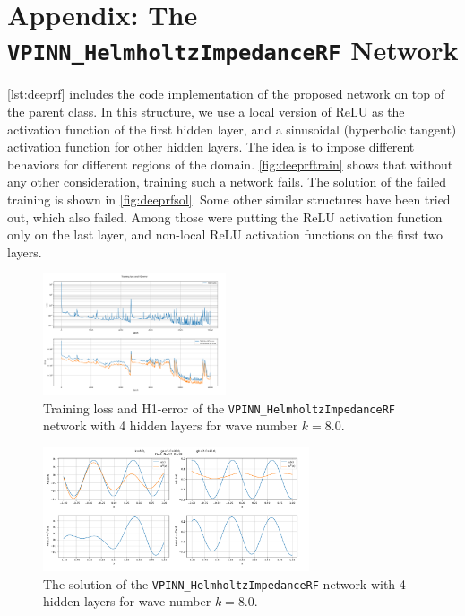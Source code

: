 \appendix


\section{Appendix: The \texttt{VPINN\_HelmholtzImpedanceRF} Network} \label{app:deeprf}
\autoref{lst:deeprf} includes the code implementation of the proposed network on top of the parent class. In this structure, we use a local version of ReLU as the activation function of the first hidden layer, and a sinusoidal (hyperbolic tangent) activation function for other hidden layers. The idea is to impose different behaviors for different regions of the domain. \autoref{fig:deeprftrain} shows that without any other consideration, training such a network fails. The solution of the failed training is shown in \autoref{fig:deeprfsol}. Some other similar structures have been tried out, which also failed. Among those were putting the ReLU activation function only on the last layer, and non-local ReLU activation functions on the first two layers.

\begin{figure}[h!]
    \centering
    \includegraphics[width = 0.48\textwidth]{img/DeepRF-D004N012K038-training.png}
    \caption{Training loss and H1-error of the \texttt{VPINN\_HelmholtzImpedanceRF} network with 4 hidden layers for wave number $k=8.0$.}
    \label{fig:deeprftrain}
\end{figure}

\begin{figure}[h!]
    \centering
    \includegraphics[width = 0.7\textwidth]{img/DeepRF-D004N012K038-sol.png}
    \caption{The solution of the \texttt{VPINN\_HelmholtzImpedanceRF} network with 4 hidden layers for wave number $k=8.0$.}
    \label{fig:deeprfsol}
\end{figure}

